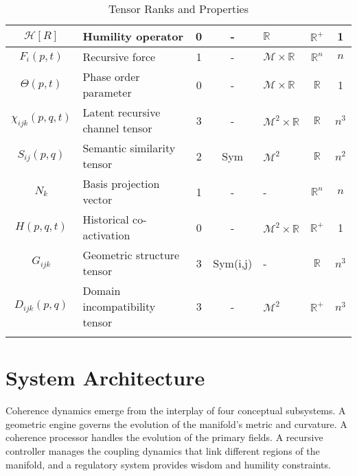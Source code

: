 {\begin{longtable}{|c|p{5.5cm}|c|c|p{1.5cm}|c|c|}
\hline
\(\mathcal{H}[R]\) & Humility operator & 0 & - & \(\mathbb{R}\) & \(\mathbb{R}^+\) & 1 \\
\hline
\(F_i(p,t)\) & Recursive force & 1 & - & \(\mathcal{M} \times \mathbb{R}\) & \(\mathbb{R}^n\) & \(n\) \\
\hline
\(\Theta(p,t)\) & Phase order parameter & 0 & - & \(\mathcal{M} \times \mathbb{R}\) & \(\mathbb{R}\) & 1 \\
\hline
\(\chi_{ijk}(p,q,t)\) & Latent recursive channel tensor & 3 & - & \(\mathcal{M}^2 \times \mathbb{R}\) & \(\mathbb{R}\) & \(n^3\) \\
\hline
\(S_{ij}(p,q)\) & Semantic similarity tensor\footnotemark[2] & 2 & Sym & \(\mathcal{M}^2\) & \(\mathbb{R}\) & \(n^2\) \\
\hline
\(N_k\) & Basis projection vector & 1 & - & - & \(\mathbb{R}^n\) & \(n\) \\
\hline
\(H(p,q,t)\) & Historical co-activation\footnotemark[3] & 0 & - & \(\mathcal{M}^2 \times \mathbb{R}\) & \(\mathbb{R}^+\) & 1 \\
\hline
\(G_{ijk}\) & Geometric structure tensor & 3 & Sym(i,j) & - & \(\mathbb{R}\) & \(n^3\) \\
\hline
\(D_{ijk}(p,q)\) & Domain incompatibility tensor & 3 & - & \(\mathcal{M}^2\) & \(\mathbb{R}^+\) & \(n^3\) \\
\hline
\caption{Tensor Ranks and Properties}
\end{longtable}
}


\section{System Architecture}

Coherence dynamics emerge from the interplay of four conceptual subsystems. A geometric engine governs the evolution of the manifold's metric and curvature. A coherence processor handles the evolution of the primary fields. A recursive controller manages the coupling dynamics that link different regions of the manifold, and a regulatory system provides wisdom and humility constraints.

